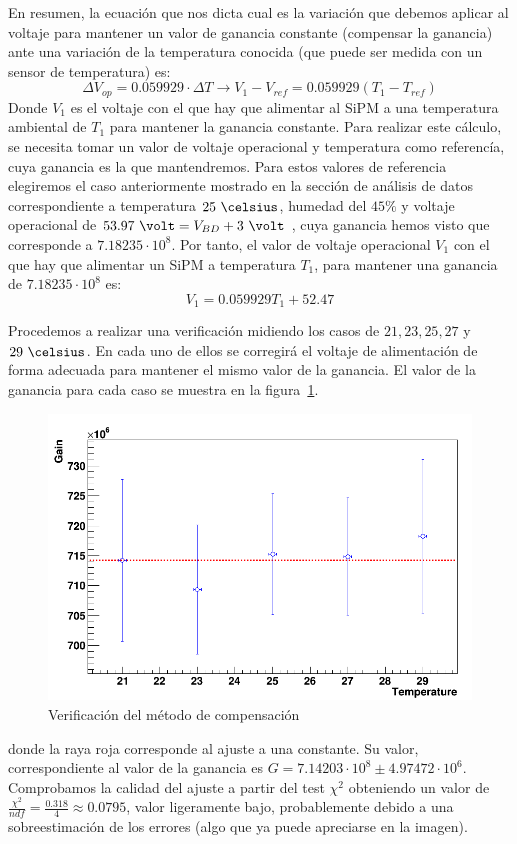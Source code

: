 En resumen, la ecuación que nos dicta cual es la variación que debemos aplicar al voltaje para mantener un valor de ganancia constante (compensar la ganancia) ante una variación de la temperatura conocida (que puede ser medida con un sensor de temperatura) es:
\begin{equation}
\Delta V_{op}=0.059929 \cdot \Delta T \longrightarrow V_1-V_{ref}=0.059929(T_1-T_{ref})
\label{compensacionfinal}
\end{equation}
Donde $V_1$ es el voltaje con el que hay que alimentar al SiPM a una temperatura ambiental de $T_1$ para mantener la ganancia constante. Para realizar este cálculo, se necesita tomar un valor de voltaje operacional y temperatura como referencía, cuya ganancia es la que mantendremos. Para estos valores de referencia elegiremos el caso anteriormente mostrado en la sección de análisis de datos correspondiente a temperatura $25~\celsius$, humedad del $45\% $ y voltaje operacional de $53.97~\volt = V_{BD}+ 3~\volt$ , cuya ganancia hemos visto que corresponde a $7.18235 \cdot 10^8$. Por tanto, el valor de voltaje operacional $V_1$ con el que hay que alimentar un SiPM a temperatura $T_1$, para mantener una ganancia de $7.18235 \cdot 10^8$ es:
\begin{equation}
V_1=0.059929T_1+52.47
\label{compensacionfinal}
\end{equation}




Procedemos a realizar una verificación midiendo los casos de $21, 23, 25, 27$ y  $29~\celsius$. En cada uno de ellos se corregirá el voltaje de alimentación de forma adecuada para mantener el mismo valor de la ganancia. El valor de la ganancia para cada caso se muestra en la figura~\ref{compensacion}. 

\begin{figure}[hbtp]
\centering
\includegraphics[scale=0.4]{compensacion.png}
\caption{Verificación del método de compensación\label{compensacion}}
\end{figure}
donde la raya roja corresponde al ajuste a una constante. Su valor, correspondiente al valor de la ganancia es $G=7.14203 \cdot 10^8 \pm 4.97472 \cdot 10^6$. Comprobamos la calidad del ajuste a partir del test $\chi^2$ obteniendo un valor de $\frac{\chi^2}{ndf}=\frac{0.318}{4}\approx 0.0795$, valor ligeramente bajo, probablemente debido a una sobreestimación de los errores (algo que ya puede apreciarse en la imagen).

